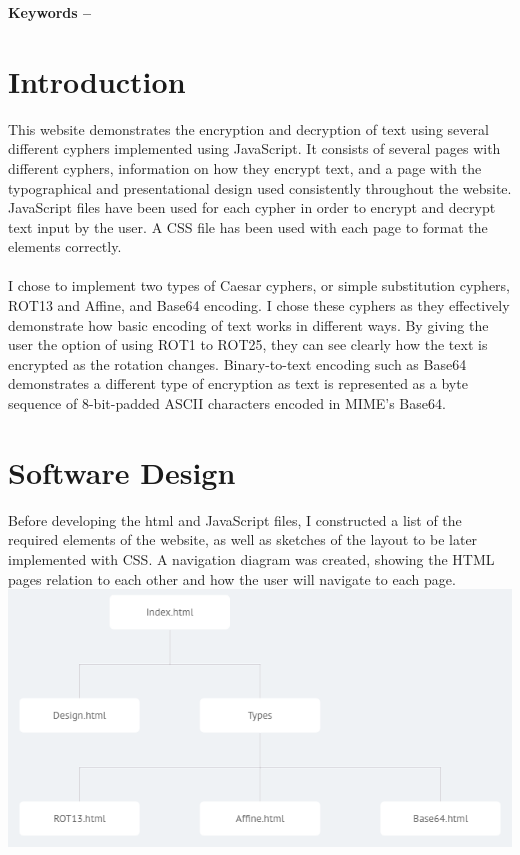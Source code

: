 \documentclass[10pt, a4paper]{article}
\title{\mytitle}
\author{\myauthor\hspace{1em}\\\contact\\Edinburgh Napier University\hspace{0.5em}-\hspace{0.5em}\mymodule}
\date{}
\begin{document}
    \maketitle
    \textbf{Keywords -- }{\mykeywords}
    
    \section{Introduction}
    This website demonstrates the encryption and decryption of text using several different cyphers implemented using JavaScript. It consists of several pages with different cyphers, information on how they encrypt text, and a page with the typographical and presentational design used consistently throughout the website. JavaScript files have been used for each cypher in order to encrypt and decrypt text input by the user. A CSS file has been used with each page to format the elements correctly. 
\\\\  I chose to implement two types of Caesar cyphers, or simple substitution cyphers, ROT13 and Affine, and Base64 encoding. I chose these cyphers as they effectively demonstrate how basic encoding of text works in different ways. By giving the user the option of using ROT1 to ROT25, they can see clearly how the text is encrypted as the rotation changes. Binary-to-text encoding such as Base64 demonstrates a different type of encryption as text is represented as a byte sequence of 8-bit-padded ASCII characters encoded in MIME's Base64. \cite{Base64}


	\section{Software Design}
	Before developing the html and JavaScript files, I 
	constructed a list of the required elements of the website, as well as sketches of the layout to be later implemented with CSS. A navigation diagram was created, showing the HTML pages relation to each other and how the user will navigate to each page.
	\includegraphics[scale=0.52]{tree} 
	
\end{document}
